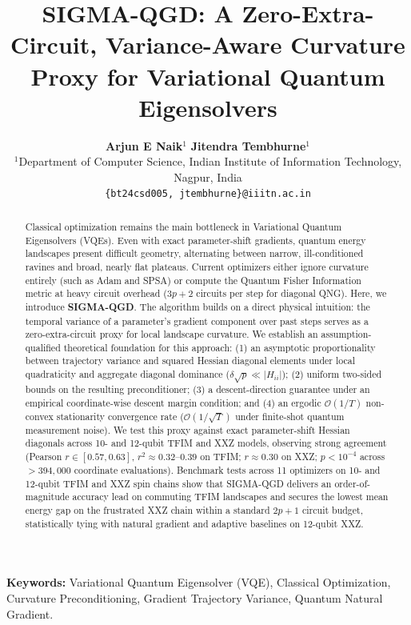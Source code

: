 \documentclass[11pt,a4paper]{article}
\title{\textbf{SIGMA-QGD: A Zero-Extra-Circuit, Variance-Aware Curvature Proxy for Variational Quantum Eigensolvers}}
\author{
    \textbf{Arjun E Naik}$^{1}$ \quad \textbf{Jitendra Tembhurne}$^{1}$ \\[1ex]
    $^{1}$Department of Computer Science, Indian Institute of Information Technology, Nagpur, India \\
    \texttt{\{bt24csd005, jtembhurne\}@iiitn.ac.in}
}
\date{}
\begin{document}
\maketitle

\begin{abstract}
Classical optimization remains the main bottleneck in Variational Quantum Eigensolvers (VQEs). Even with exact parameter-shift gradients, quantum energy landscapes present difficult geometry, alternating between narrow, ill-conditioned ravines and broad, nearly flat plateaus. Current optimizers either ignore curvature entirely (such as Adam and SPSA) or compute the Quantum Fisher Information metric at heavy circuit overhead ($3p+2$ circuits per step for diagonal QNG). Here, we introduce \textbf{SIGMA-QGD}. The algorithm builds on a direct physical intuition: the temporal variance of a parameter's gradient component over past steps serves as a zero-extra-circuit proxy for local landscape curvature. We establish an assumption-qualified theoretical foundation for this approach: (1) an asymptotic proportionality between trajectory variance and squared Hessian diagonal elements under local quadraticity and aggregate diagonal dominance ($\delta \sqrt{p} \ll |H_{ii}|$); (2) uniform two-sided bounds on the resulting preconditioner; (3) a descent-direction guarantee under an empirical coordinate-wise descent margin condition; and (4) an ergodic $\mathcal{O}(1/T)$ non-convex stationarity convergence rate ($\mathcal{O}(1/\sqrt{T})$ under finite-shot quantum measurement noise). We test this proxy against exact parameter-shift Hessian diagonals across 10- and 12-qubit TFIM and XXZ models, observing strong agreement (Pearson $r \in [0.57, 0.63]$, $r^2 \approx 0.32\text{--}0.39$ on TFIM; $r \approx 0.30$ on XXZ; $p < 10^{-4}$ across $>394{,}000$ coordinate evaluations). Benchmark tests across 11 optimizers on 10- and 12-qubit TFIM and XXZ spin chains show that SIGMA-QGD delivers an order-of-magnitude accuracy lead on commuting TFIM landscapes and secures the lowest mean energy gap on the frustrated XXZ chain within a standard $2p+1$ circuit budget, statistically tying with natural gradient and adaptive baselines on 12-qubit XXZ.
\end{abstract}

\textbf{Keywords:} Variational Quantum Eigensolver (VQE), Classical Optimization, Curvature Preconditioning, Gradient Trajectory Variance, Quantum Natural Gradient.

\newpage

\end{document}
